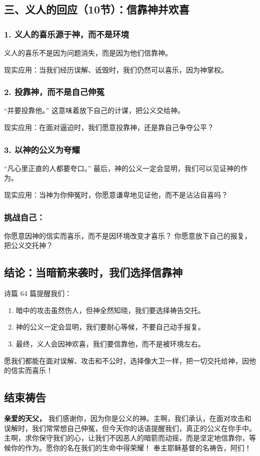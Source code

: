 \documentclass[a4paper, 12pt]{article}
\begin{document}
\subsection*{三、义人的回应（10节）：信靠神并欢喜}

\subsubsection*{1. 义人的喜乐源于神，而不是环境}
\hspace{0.6cm}义人的喜乐不是因为问题消失，而是因为他们信靠神。

现实应用：当我们经历误解、诋毁时，我们仍然可以喜乐，因为神掌权。
\subsubsection*{2. 投靠神，而不是自己伸冤}
“并要投靠他。” 这意味着放下自己的计谋，把公义交给神。

现实应用：在面对逼迫时，我们愿意投靠神，还是靠自己争夺公平？
\subsubsection*{3. 以神的公义为夸耀}
“凡心里正直的人都要夸口。” 最后，神的公义一定会显明，我们可以见证神的作为。

现实应用：当神为你伸冤时，你愿意谦卑地见证他，而不是沾沾自喜吗？
\subsubsection*{挑战自己：}
你愿意因神的信实而喜乐，而不是因环境改变才喜乐？
你愿意放下自己的报复，把公义交托神？
\subsection*{结论：当暗箭来袭时，我们选择信靠神}
诗篇 64 篇提醒我们：
\begin{enumerate}
    \item 暗中的攻击虽然伤人，但神全然知晓，我们要选择祷告交托。

    \item 神的公义一定会显明，我们要耐心等候，不要自己动手报复。

    \item 最终，义人会因神欢喜，我们要信靠他，而不是被环境左右。
\end{enumerate}

愿我们都能在面对误解、攻击和不公时，选择像大卫一样，把一切交托给神，因他的信实而喜乐！

\subsection*{结束祷告}
\textbf{亲爱的天父，}
我们感谢你，因为你是公义的神。主啊，我们承认，在面对攻击和误解时，我们常常想自己伸冤，但今天你的话语提醒我们，真正的公义在你手中。主啊，求你保守我们的心，让我们不因恶人的暗箭而动摇，而是坚定地信靠你，等候你的作为。愿你的名在我们的生命中得荣耀！
奉主耶稣基督的名祷告，阿们！
\newpage
\end{document}
